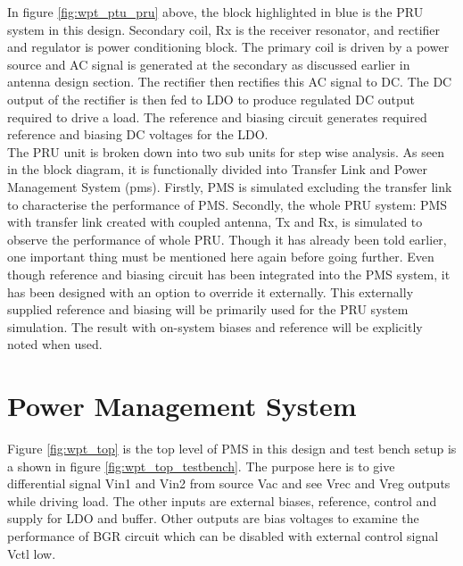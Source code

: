 \documentclass[12pt,a4paper,UKenglish]{report}
\begin{document}
In figure \ref{fig:wpt_ptu_pru} above, the block highlighted in blue is the PRU system in this design. Secondary coil, Rx is the receiver resonator, and  
rectifier and regulator is power conditioning block. The primary coil is driven by a power source and AC signal is generated at the secondary as discussed 
earlier in antenna design section. The rectifier then rectifies this AC signal to DC. The DC output of the rectifier is then fed to LDO 
to produce regulated DC output required to drive a load. The reference and biasing circuit generates required reference and biasing DC voltages for the LDO. \\

The PRU unit is broken down into two sub units for step wise analysis. As seen in the block diagram, it is functionally divided into Transfer Link and 
Power Management System (\acrshort{pms}). Firstly, PMS is simulated excluding the transfer link to characterise the performance of PMS. Secondly, the whole PRU system: PMS with transfer link created with coupled antenna, Tx and Rx, is simulated to observe the performance of whole PRU. Though it has already been told earlier, 
one important thing must be mentioned here again before going further. Even though reference and biasing circuit has 
been integrated into the PMS system, it has been designed with an option to override it externally. This externally 
supplied reference and biasing will be primarily used for the PRU system simulation. The result with on-system biases 
and reference will be explicitly noted when used. \\


\section{Power Management System} %

Figure \ref{fig:wpt_top} is the top level of PMS in this design and test bench setup is a shown in figure \ref{fig:wpt_top_testbench}. The purpose here is to give differential signal Vin1 and Vin2 from source Vac and see Vrec and Vreg outputs while driving load. The other inputs are external biases, reference, control and supply for LDO and buffer. Other outputs are bias voltages to examine the performance of BGR circuit which can be disabled with external control signal Vctl low.  \\
\end{document}

